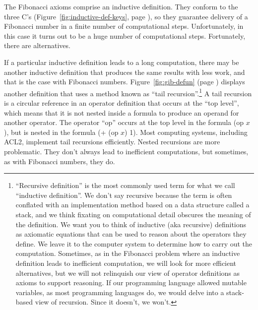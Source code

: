 The Fibonacci axioms comprise an
inductive definition.
They conform to the three C's
(Figure~\ref{fig:inductive-def-keys}, page \pageref{fig:inductive-def-keys}),
so they guarantee delivery of a Fibonacci number
in a finite number of computational steps.
Unfortunately, in this case it turns out to be
a huge number of computational steps.
Fortunately, there are alternatives.

If a particular inductive definition leads to a long computation,
there may be another inductive definition that produces the same
results with less work,
and that is the case with Fibonacci numbers.
Figure~\ref{fig:gib-defun} (page \pageref{fig:gib-defun})
displays another definition that uses a method known as
``tail recursion''.\footnote{``Recursive definition''
is the most commonly used term for what we call ``inductive definition''.
We don't say recursive because the term is often conflated
with an implementation method based on a data structure called a stack,
and we think fixating on computational detail obscures the meaning
of the definition.
We want you to think of inductive (aka recursive)
definitions as axiomatic equations that can be used to reason about the
operators they define. We leave it to the computer system
to determine how to carry out the computation.
Sometimes, as in the Fibonacci problem
where an inductive definition leads to inefficient computation,
we will look for more efficient alternatives,
but we will not relinquish our view of operator definitions
as axioms to support reasoning. If our programming language allowed
mutable variables, as most programming languages do, we would
delve into a stack-based view of recursion.
Since it doesn't, we won't.}
A tail recursion is a circular reference in an operator definition
that occurs at the
``top level'',
which means that it is not nested
inside a formula to produce an operand for
another operator. The operator ``op'' occurs at the top level
in the formula (op $x$), but is nested in the formula (+ (op $x$) 1).
Most computing systems, including ACL2,
implement tail recursions efficiently. Nested recursions are
more problematic. They don't always lead to inefficient computations,
but sometimes, as with Fibonacci numbers, they do.

